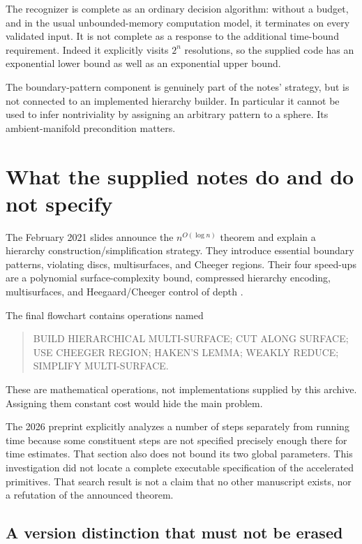 \documentclass[11pt]{article}
\theoremstyle{definition}\newtheorem{definition}[theorem]{Definition}
\begin{document}
The recognizer is complete as an ordinary decision algorithm: without a budget,
and in the usual unbounded-memory computation model, it terminates on every
validated input. It is not complete as a response to the additional time-bound
requirement. Indeed it explicitly visits $2^n$ resolutions, so the supplied code
has an exponential lower bound as well as an exponential upper bound.

The boundary-pattern component is genuinely part of the notes' strategy, but
is not connected to an implemented hierarchy builder. In particular it cannot
be used to infer nontriviality by assigning an arbitrary pattern to a sphere.
Its ambient-manifold precondition matters.

\section{What the supplied notes do and do not specify}

The February 2021 slides announce the $n^{O(\log n)}$ theorem and explain a
hierarchy construction/simplification strategy. They introduce essential
boundary patterns, violating discs, multisurfaces, and Cheeger regions. Their
four speed-ups are a polynomial surface-complexity bound, compressed hierarchy
encoding, multisurfaces, and Heegaard/Cheeger control of depth
\cite[physical pages 66--74]{notes}.

The final flowchart contains operations named
\begin{quote}\small\ttfamily
BUILD HIERARCHICAL MULTI-SURFACE; CUT ALONG SURFACE;\\
USE CHEEGER REGION; HAKEN'S LEMMA; WEAKLY REDUCE;\\
SIMPLIFY MULTI-SURFACE.
\end{quote}
These are mathematical operations, not implementations supplied by this
archive. Assigning them constant cost would hide the main problem.

The 2026 preprint \cite[Section 9]{hierarchies} explicitly analyzes a number of
steps separately from running time because some constituent steps are not
specified precisely enough there for time estimates. That section also does
not bound its two global parameters. This investigation did not locate a
complete executable specification of the accelerated primitives. That search
result is not a claim that no other manuscript exists, nor a refutation of the
announced theorem.

\subsection{A version distinction that must not be erased}
\end{document}
